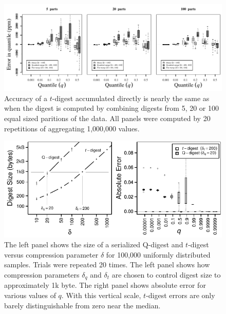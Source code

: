 \documentclass[]{statsoc}
\begin{document}
\begin{figure}[p] %
   \centering
   \includegraphics[width=5.5in]{figures/merge.pdf} 
   \caption{Accuracy of a $t$-digest accumulated directly is nearly the same as when the digest is computed by combining digests from 5, 20 or 100 equal sized paritions of the data.  All panels were computed by 20 repetitions of aggregating 1,000,000 values. }
   \label{fig:merge}
\end{figure}
\begin{figure}[p] %
   \centering
   \includegraphics[width=4.5in]{figures/qd-sizes.pdf} 
   \caption{The left panel shows the size of a serialized Q-digest and $t$-digest versus compression parameter $\delta$ for 100,000 uniformly distributed samples. Trials were repeated 20 times. The left panel shows how compression parameters $\delta_q$ and $\delta_t$ are chosen to control digest size to approximately 1k byte. The right panel shows absolute error for various values of $q$.  With this vertical scale, $t$-digest errors are only barely distinguishable from zero near the median.  }
   \label{fig:qd-comparison}
\end{figure}
\end{document}
